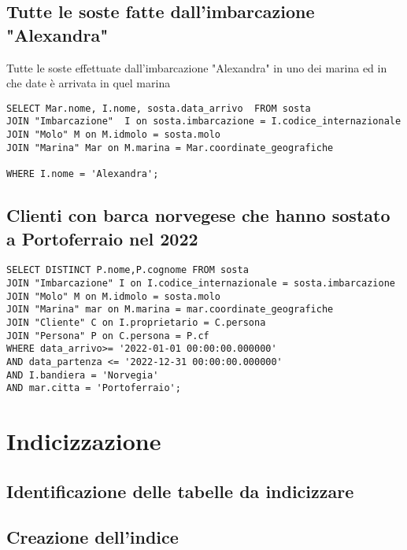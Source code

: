 \subsection{Tutte le soste fatte dall'imbarcazione "Alexandra"}

Tutte le soste effettuate dall'imbarcazione "Alexandra" in uno dei marina ed in che date è arrivata in quel marina

\begin{lstlisting}
SELECT Mar.nome, I.nome, sosta.data_arrivo  FROM sosta
JOIN "Imbarcazione"  I on sosta.imbarcazione = I.codice_internazionale
JOIN "Molo" M on M.idmolo = sosta.molo
JOIN "Marina" Mar on M.marina = Mar.coordinate_geografiche

WHERE I.nome = 'Alexandra';
\end{lstlisting}

\subsection{Clienti con barca norvegese che hanno sostato a Portoferraio nel 2022}

\begin{lstlisting}
SELECT DISTINCT P.nome,P.cognome FROM sosta
JOIN "Imbarcazione" I on I.codice_internazionale = sosta.imbarcazione
JOIN "Molo" M on M.idmolo = sosta.molo
JOIN "Marina" mar on M.marina = mar.coordinate_geografiche
JOIN "Cliente" C on I.proprietario = C.persona
JOIN "Persona" P on C.persona = P.cf
WHERE data_arrivo>= '2022-01-01 00:00:00.000000'
AND data_partenza <= '2022-12-31 00:00:00.000000'
AND I.bandiera = 'Norvegia'
AND mar.citta = 'Portoferraio';
\end{lstlisting}

\section{Indicizzazione}
\subsection{Identificazione delle tabelle da indicizzare}
\subsection{Creazione dell'indice}
